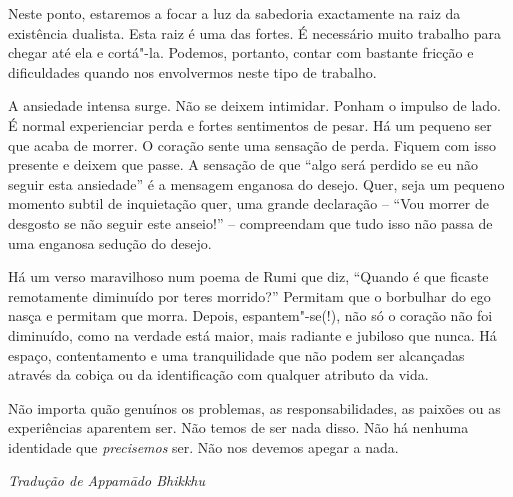 Neste ponto, estaremos a focar a luz da sabedoria exactamente na raiz da
existência dualista. Esta raiz é uma das fortes. É necessário muito
trabalho para chegar até ela e cortá"-la. Podemos, portanto, contar com
bastante fricção e dificuldades quando nos envolvermos neste tipo de
trabalho.

A ansiedade intensa surge. Não se deixem intimidar. Ponham o impulso de
lado. É normal experienciar perda e fortes sentimentos de pesar. Há um
pequeno ser que acaba de morrer. O coração sente uma sensação de perda.
Fiquem com isso presente e deixem que passe. A sensação de que ``algo
será perdido se eu não seguir esta ansiedade'' é a mensagem enganosa do
desejo. Quer, seja um pequeno momento subtil de inquietação quer, uma
grande declaração -- ``Vou morrer de desgosto se não seguir este
anseio!'' -- compreendam que tudo isso não passa de uma enganosa sedução
do desejo.

Há um verso maravilhoso num poema de Rumi que diz, ``Quando é que
ficaste remotamente diminuído por teres morrido?'' Permitam que o
borbulhar do ego nasça e permitam que morra. Depois, espantem"-se(!), não
só o coração não foi diminuído, como na verdade está maior, mais
radiante e jubiloso que nunca. Há espaço, contentamento e uma
tranquilidade que não podem ser alcançadas através da cobiça ou da
identificação com qualquer atributo da vida.

Não importa quão genuínos os problemas, as responsabilidades, as paixões
ou as experiências aparentem ser. Não temos de ser nada disso. Não há
nenhuma identidade que \emph{precisemos} ser. Não nos devemos apegar a
nada.

\vfill
{\raggedleft\itshape\small
  Tradução de Appamādo Bhikkhu
\par}
